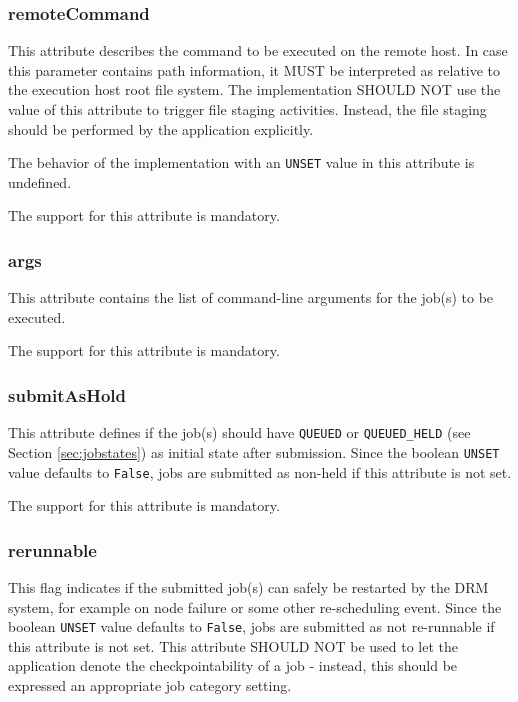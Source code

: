 \documentclass{article}
\newcommand{\h}[1]{\lstinline|#1|}
\begin{document}
\subsubsection{remoteCommand}

This attribute describes the command to be executed on the remote host. In case this parameter contains path information, it MUST be interpreted as relative to the execution host root file system. The implementation SHOULD NOT use the value of this attribute to trigger file staging activities. Instead, the file staging should be performed by the application explicitly. 

The behavior of the implementation with an \h{UNSET} value in this attribute is undefined.

The support for this attribute is mandatory. 

\subsubsection{args}

This attribute contains the list of command-line arguments for the job(s) to be executed. 

The support for this attribute is mandatory.

\subsubsection{submitAsHold}

This attribute defines if the job(s) should have \h{QUEUED} or \h{QUEUED_HELD} (see Section \ref{sec:jobstates}) as initial state after submission. Since the boolean \h{UNSET} value defaults to \h{False}, jobs are submitted as non-held if this attribute is not set. 

The support for this attribute is mandatory.

\subsubsection{rerunnable}

This flag indicates if the submitted job(s) can safely be restarted by the DRM system, for example on node failure or some other re-scheduling event. Since the boolean \h{UNSET} value defaults to \h{False}, jobs are submitted as not re-runnable if this attribute is not set. This attribute SHOULD NOT be used to let the application denote the checkpointability of a job - instead, this should be expressed an appropriate job category setting.
\end{document}
